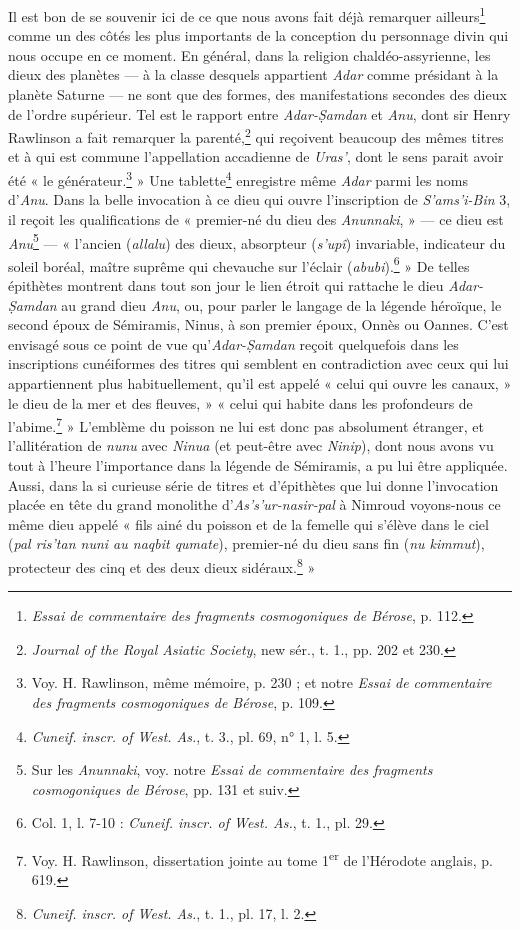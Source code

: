 \documentclass[a4paper, 11pt, oneside]{article}
\begin{document}
Il est bon de se souvenir ici de ce que nous avons fait déjà remarquer ailleurs\footnote{\emph{Essai de commentaire des fragments cosmogoniques de Bérose}, p. 112.} comme un des côtés les plus importants de la conception du personnage divin qui nous occupe en ce moment. En général, dans la religion chaldéo-assyrienne, les dieux des planètes --- à la classe desquels appartient \emph{Adar} comme présidant à la planète Saturne --- ne sont que des formes, des manifestations secondes des dieux de l'ordre supérieur. Tel est le rapport entre \emph{Adar-\d{S}amdan} et \emph{Anu}, dont sir Henry Rawlinson a fait remarquer la parenté,\footnote{\emph{Journal of the Royal Asiatic Society}, new sér., t. 1., pp. 202 et 230.} qui reçoivent beaucoup des mêmes titres et à qui est commune l'appellation accadienne de \emph{Uras'}, dont le sens parait avoir été « le générateur.\footnote{Voy. H. Rawlinson, même mémoire, p. 230 ; et notre \emph{Essai de commentaire des fragments cosmogoniques de Bérose}, p. 109.} » Une tablette\footnote{\emph{Cuneif. inscr. of West. As.}, t. 3., pl. 69, n° 1, l. 5.} enregistre même \emph{Adar} parmi les noms d'\emph{Anu}. Dans la belle invocation à ce dieu qui ouvre l'inscription de \emph{S'ams'i-Bin} 3, il reçoit les qualifications de « premier-né du dieu des \emph{Anunnaki}, » --- ce dieu est \emph{Anu}\footnote{Sur les \emph{Anunnaki}, voy. notre \emph{Essai de commentaire des fragments cosmogoniques de Bérose}, pp. 131 et suiv.} --- « l'ancien (\emph{allalu}) des dieux, absorpteur (\emph{s'upî}) invariable, indicateur du soleil boréal, maître suprême qui chevauche sur l'éclair (\emph{abubi}).\footnote{Col. 1, l. 7-10 : \emph{Cuneif. inscr. of West. As.}, t. 1., pl. 29.} » De telles épithètes montrent dans tout son jour le lien étroit qui rattache le dieu \emph{Adar-\d{S}amdan} au grand dieu \emph{Anu}, ou, pour parler le langage de la légende héroïque, le second époux de Sémiramis, Ninus, à son premier époux, Onnès ou Oannes. C'est envisagé sous ce point de vue qu'\emph{Adar-\d{S}amdan} reçoit quelquefois dans les inscriptions cunéiformes des titres qui semblent en contradiction avec ceux qui lui appartiennent plus habituellement, qu'il est appelé « celui qui ouvre les canaux, » le dieu de la mer et des fleuves, » « celui qui habite dans les profondeurs de l'abime.\footnote{Voy. H. Rawlinson, dissertation jointe au tome 1\textsuperscript{er} de l'Hérodote anglais, p. 619.} » L'emblème du poisson ne lui est donc pas absolument étranger, et l'allitération de \emph{nunu} avec \emph{Ninua} (et peut-être avec \emph{Ninip}), dont nous avons vu tout à l'heure l'importance dans la légende de Sémiramis, a pu lui être appliquée. Aussi, dans la si curieuse série de titres et d'épithètes que lui donne l'invocation placée en tête du grand monolithe d'\emph{As's'ur-nasir-pal} à Nimroud voyons-nous ce même dieu appelé « fils ainé du poisson et de la femelle qui s'élève dans le ciel (\emph{pal ris'tan nuni au naqbit qumate}), premier-né du dieu sans fin (\emph{nu kimmut}), protecteur des cinq et des deux dieux sidéraux.\footnote{\emph{Cuneif. inscr. of West. As.}, t. 1., pl. 17, l. 2.} »
\end{document}
